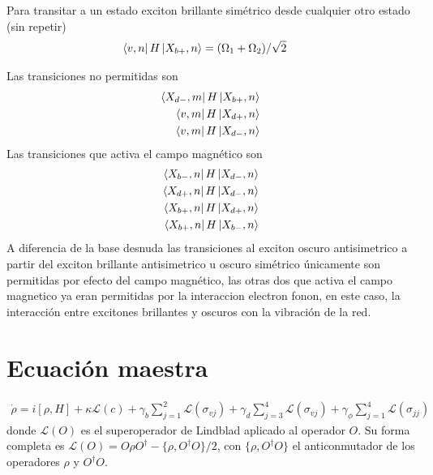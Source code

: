 \documentclass[../main.tex]{subfiles}
\begin{document}
Para transitar a un estado exciton brillante simétrico desde cualquier otro estado (sin repetir)
\begin{align*}
    \bra{v,n} H \ket{X_{b+},n} &= (\Omega_1+\Omega_2)/\sqrt{2}
\end{align*}

Las transiciones no permitidas son
\begin{align*}
    \bra{X_{d-},m}H\ket{X_{b+},n}\\
    \bra{v,m}H\ket{X_{d+},n}\\
    \bra{v,m}H\ket{X_{d-},n}
\end{align*}
Las transiciones que activa el campo magnético son
\begin{align*}
    \bra{X_{b-},n} H \ket{X_{d-},n}\\
    \bra{X_{d+},n} H \ket{X_{d-},n}\\
    \bra{X_{b+},n} H \ket{X_{d+},n}\\
    \bra{X_{b+},n} H \ket{X_{b-},n}
\end{align*}
A diferencia de la base desnuda las transiciones al exciton oscuro antisimetrico a partir del exciton brillante antisimetrico u oscuro simétrico únicamente son permitidas por efecto del campo magnético, las otras dos que activa el campo magnetico ya eran permitidas por la interaccion electron fonon, en este caso, la interacción entre excitones brillantes y oscuros con la vibración de la red. 
\chapter{Ecuación maestra}
\begin{align}
    \dot{\rho} = i[\rho, H] + \kappa \mathcal{L}(c) + \gamma_b \sum_{j=1}^2 \mathcal{L}(\sigma_{vj}) + \gamma_d \sum_{j=3}^4 \mathcal{L}(\sigma_{vj}) + \gamma_\phi \sum_{j=1}^4 \mathcal{L}(\sigma_{jj})
\end{align}
donde $\mathcal{L}(O)$ es el superoperador de Lindblad  aplicado al operador $O$. Su forma completa es $\mathcal{L}(O) = O\rho O^\dagger - \{\rho, O^\dagger O\}/2$, con $\{\rho,O^\dagger O\}$ el anticonmutador de los operadores $\rho$ y $O^\dagger O$.
\end{document}
